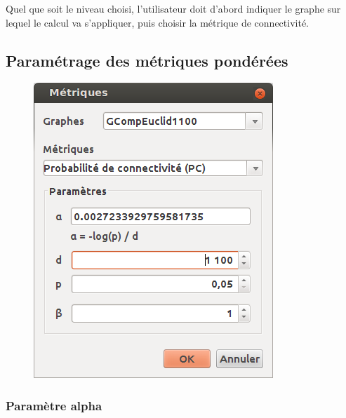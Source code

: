 \documentclass{article}
\begin{document}
Quel que soit le niveau choisi, l’utilisateur doit d’abord indiquer le graphe sur lequel le calcul va s’appliquer, puis choisir la métrique de connectivité.

\subsection{Paramétrage des métriques pondérées}
\label{param_weight}

\begin{figure}[H]
	\includegraphics[scale=0.5]{img/manual-fr_img10.png} 
\end{figure}

\subsubsection{Paramètre alpha}
\end{document}
